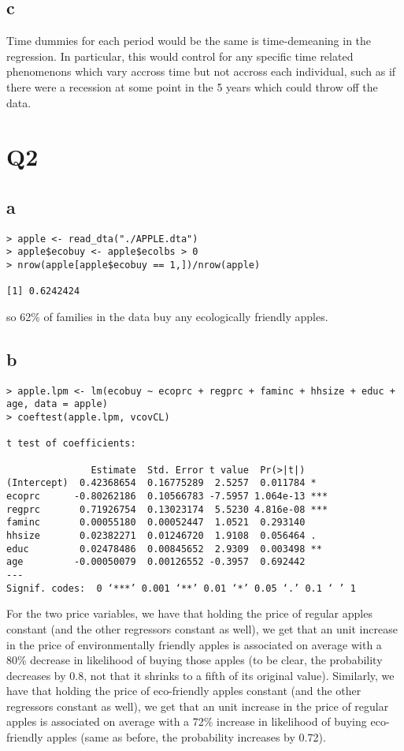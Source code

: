 \documentclass[12pt,letterpaper]{article}
\theoremstyle{definition}
\begin{document}
\subsection*{c}

Time dummies for each period would be the same is time-demeaning in the regression. In particular, this would control for any specific time related phenomenons which vary accross time but not accross each individual, such as if there were a recession at some point in the 5 years which could throw off the data.

\section*{Q2}
\subsection*{a}

\begin{Verbatim}[fontsize=\small]
> apple <- read_dta("./APPLE.dta")
> apple$ecobuy <- apple$ecolbs > 0
> nrow(apple[apple$ecobuy == 1,])/nrow(apple)

[1] 0.6242424
\end{Verbatim}
so 62\% of families in the data buy any ecologically friendly apples.

\subsection*{b}

\begin{Verbatim}[fontsize=\small]
> apple.lpm <- lm(ecobuy ~ ecoprc + regprc + faminc + hhsize + educ + age, data = apple)
> coeftest(apple.lpm, vcovCL)

t test of coefficients:

               Estimate  Std. Error t value  Pr(>|t|)
(Intercept)  0.42368654  0.16775289  2.5257  0.011784 *
ecoprc      -0.80262186  0.10566783 -7.5957 1.064e-13 ***
regprc       0.71926754  0.13023174  5.5230 4.816e-08 ***
faminc       0.00055180  0.00052447  1.0521  0.293140
hhsize       0.02382271  0.01246720  1.9108  0.056464 .
educ         0.02478486  0.00845652  2.9309  0.003498 **
age         -0.00050079  0.00126552 -0.3957  0.692442
---
Signif. codes:  0 ‘***’ 0.001 ‘**’ 0.01 ‘*’ 0.05 ‘.’ 0.1 ‘ ’ 1
\end{Verbatim}

For the two price variables, we have that holding the price of regular apples constant (and the other regressors constant as well), we get that an unit increase in the price of environmentally friendly apples is associated on average with a 80\% decrease in likelihood of buying those apples (to be clear, the probability decreases by 0.8, not that it shrinks to a fifth of its original value). Similarly, we have that holding the price of eco-friendly apples constant (and the other regressors constant as well), we get that an unit increase in the price of regular apples is associated on average with a 72\% increase in likelihood of buying eco-friendly apples (same as before, the probability increases by 0.72).
\end{document}
